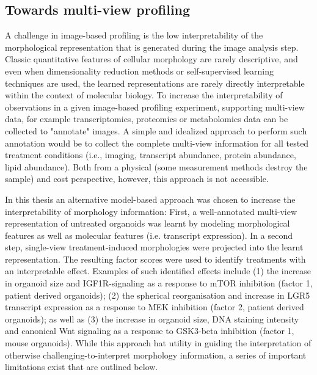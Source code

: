 \begin{flushleft}
\subsection{Towards multi-view profiling}
A challenge in image-based profiling is the low interpretability of the morphological representation that is generated during the image analysis step. Classic quantitative features of cellular morphology are rarely descriptive, and even when dimensionality reduction methods or self-supervised learning techniques are used, the learned representations are rarely directly interpretable within the context of molecular biology. To increase the interpretability of observations in a given image-based profiling experiment, supporting multi-view data, for example transcriptomics, proteomics or metabolomics data can be collected to "annotate" images. A simple and idealized approach to perform such annotation would be to collect the complete multi-view information for all tested treatment conditions (i.e., imaging, transcript abundance, protein abundance, lipid abundance). Both from a physical (some measurement methods destroy the sample) and cost perspective, however, this approach is not accessible. 
\smallbreak

In this thesis an alternative model-based approach was chosen to increase the interpretability of morphology information: First, a well-annotated multi-view representation of untreated organoids was learnt by modeling morphological features as well as molecular features (i.e. transcript expression). In a second step, single-view treatment-induced morphologies were projected into the learnt representation. The resulting factor scores were used to identify treatments with an interpretable effect. Examples of such identified effects include (1) the increase in organoid size and IGF1R-signaling as a response to mTOR inhibition (factor 1, patient derived organoids); (2) the spherical reorganisation and increase in LGR5 transcript expression as a response to MEK inhibition (factor 2, patient derived organoids); as well as (3) the increase in organoid size, DNA staining intensity and canonical Wnt signaling as a response to GSK3-beta inhibition (factor 1, mouse organoids). While this approach hat utility in guiding the interpretation of otherwise challenging-to-interpret morphology information, a series of important limitations exist that are outlined below.
\smallbreak


\end{flushleft}
